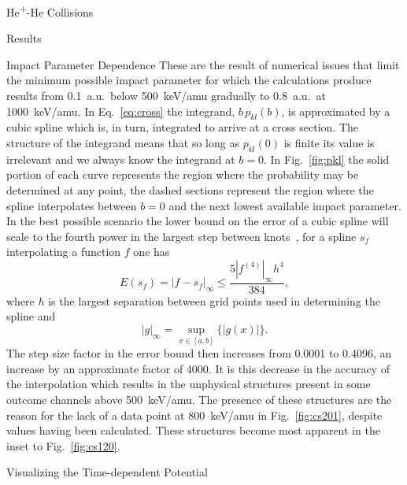 \documentclass[letterpaper, 11 pt]{report}
\begin{document}
\begin{chapter}{\texorpdfstring{He\textsuperscript{+}}{He+}-He Collisions \label{chap:hephe}}
\begin{section}{Results \label{sec:hephe-disc}}
\begin{subsection}{Impact Parameter Dependence \label{sec:hephepb}}
         These are the result of numerical issues that limit the minimum possible impact parameter for
         which the calculations produce results from 0.1~a.u.\ below 500~keV/amu gradually to 0.8~a.u.\
         at 1000~keV/amu. In Eq.~\eqref{eq:cross} the integrand, $b \, p_{kl}(b)$, is approximated by a
         cubic spline which is, in turn, integrated to arrive at a cross section. The structure of the
         integrand means that so long as $p_{kl}(0)$ is finite its value is irrelevant and we always
         know the integrand at $b = 0$. In Fig.~\ref{fig:pkl} the solid portion of each curve represents
         the region where the probability may be determined at any point, the dashed sections represent
         the region where the spline interpolates between $b = 0$ and the next lowest available impact
         parameter. In the best possible scenario the lower bound on the error of a cubic spline will
         scale to the fourth power in the largest step between knots~\cite{spline-err}, for a spline
         $s_f$ interpolating a function $f$ one has
         \begin{equation} \label{eq:splineErr}
            E(s_f) = \left| f - s_f \right|_\infty \leq \frac{5 \left| f^{(4)} \right|_\infty h^4}{384},
         \end{equation}
         where $h$ is the largest separation between grid points used in determining the spline and
         \begin{equation} \label{eq:supnorm}
            | g |_\infty = \sup\limits_{x \in [a,b]} \{ |g(x)| \}.
         \end{equation}
         The step size factor in the error bound then increases from 0.0001 to 0.4096, an increase by an
         approximate factor of 4000. It is this decrease in the accuracy of the interpolation which
         results in the unphysical structures present in some outcome channels above 500~keV/amu. The
         presence of these structures are the reason for the lack of a data point at 800~keV/amu in
         Fig.~\ref{fig:cs201}, despite values having been calculated. These structures become most
         apparent in the inset to Fig.~\ref{fig:cs120}.

      \end{subsection}

      \begin{subsection}{Visualizing the Time-dependent Potential \label{sec:visual}}


\end{subsection}
\end{section}
\end{chapter}
\end{document}
